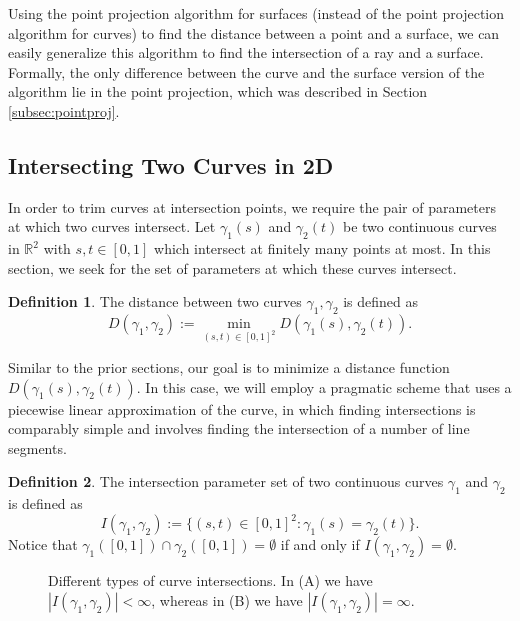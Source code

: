 \documentclass[a4paper, 11pt]{report}
\theoremstyle{definition}
\newtheorem{definition}{Definition}[section]
\begin{document}
	Using the point projection algorithm for surfaces (instead of the point projection algorithm for curves) to find the distance between a point and a surface, we can easily generalize this algorithm to find the intersection of a ray and a surface. Formally, the only difference between the curve and the surface version of the algorithm lie in the point projection, which was described in Section \ref{subsec:pointproj}.

\subsection{Intersecting Two Curves in 2D}
	In order to trim curves at intersection points, we require the pair of parameters at which two curves intersect. Let $\gamma_1(s)$ and $\gamma_2(t)$ be two continuous curves in $\mathbb{R}^2$ with $s,t \in [0,1]$ which intersect at finitely many points at most. In this section, we seek for the set of parameters at which these curves intersect.

	\begin{definition}
		The distance between two curves $\gamma_1, \gamma_2$ is defined as
			$$ D(\gamma_1, \gamma_2) := \min_{(s,t) \in [0,1]^2} D(\gamma_1(s), \gamma_2(t)).$$
	\end{definition}

	Similar to the prior sections, our goal is to minimize a distance function $D(\gamma_1(s), \gamma_2(t))$. In this case, we will employ a pragmatic scheme that uses a piecewise linear approximation of the curve, in which finding intersections is comparably simple and involves finding the intersection of a number of line segments.

	\begin{definition}
		The intersection parameter set of two continuous curves $\gamma_1$ and $\gamma_2$ is defined as
				$$ I(\gamma_1, \gamma_2) := \{(s,t) \in [0,1]^2 : \gamma_1(s) = \gamma_2(t)\}.$$
		Notice that $\gamma_1([0,1]) \cap \gamma_2([0,1]) = \emptyset$ if and only if $I(\gamma_1, \gamma_2) = \emptyset$.
	\end{definition}

	\begin{figure}[H]
		\centering
		
		\caption{Different types of curve intersections. In (A) we have $|I(\gamma_1, \gamma_2)| < \infty$, whereas in (B) we have $|I(\gamma_1, \gamma_2)| = \infty$.}
		\label{fig:curveIntersectionConnectedness}
	\end{figure}
\end{document}
